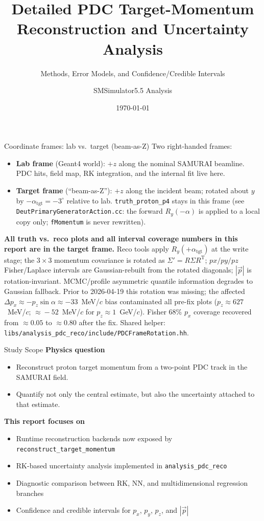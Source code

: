 \documentclass[aspectratio=169]{beamer}
\title[PDC Reconstruction and Uncertainty]{Detailed PDC Target-Momentum Reconstruction and Uncertainty Analysis}
\subtitle{Methods, Error Models, and Confidence/Credible Intervals}
\author{SMSimulator5.5 Analysis}
\date{\today}
\begin{document}
\begin{frame}
\titlepage
\end{frame}

\begin{frame}{Coordinate frames: lab vs.\ target (beam-as-Z)}
\small
Two right-handed frames:
\begin{itemize}
  \item \textbf{Lab frame} (Geant4 world): $+z$ along the nominal SAMURAI beamline.
    PDC hits, field map, RK integration, and the internal fit live here.
  \item \textbf{Target frame} (``beam-as-Z''): $+z$ along the incident beam;
    rotated about $y$ by $-\alpha_\mathrm{tgt}=-3^\circ$ relative to lab.
    \texttt{truth\_proton\_p4} stays in this frame
    (see \texttt{DeutPrimaryGeneratorAction.cc}: the forward $R_y(-\alpha)$ is
    applied to a local copy only; \texttt{fMomentum} is never rewritten).
\end{itemize}

\textbf{All truth vs.\ reco plots and all interval coverage numbers in this
report are in the target frame.} Reco tools apply $R_y(+\alpha_\mathrm{tgt})$
at the write stage; the $3\times3$ momentum covariance is rotated as
$\Sigma'=R\Sigma R^\mathrm{T}$; $px/py/pz$ Fisher/Laplace intervals are
Gaussian-rebuilt from the rotated diagonals; $|\vec p|$ is rotation-invariant.
MCMC/profile asymmetric quantile information degrades to Gaussian fallback.
Prior to 2026-04-19 this rotation was missing; the affected
$\Delta p_x \approx -p_z\sin\alpha \approx -33$~MeV/$c$ bias contaminated
all pre-fix plots ($p_z \approx 627$~MeV/$c$; $\approx\!-52$~MeV/$c$ for
$p_z \approx 1$~GeV/$c$). Fisher 68\% $p_x$ coverage recovered from $\approx 0.05$
to $\approx 0.80$ after the fix.
Shared helper: \texttt{libs/analysis\_pdc\_reco/include/PDCFrameRotation.hh}.
\end{frame}

\begin{frame}{Study Scope}
\textbf{Physics question}
\begin{itemize}
\item Reconstruct proton target momentum from a two-point PDC track in the SAMURAI field.
\item Quantify not only the central estimate, but also the uncertainty attached to that estimate.
\end{itemize}

\vspace{0.2cm}
\textbf{This report focuses on}
\begin{itemize}
\item Runtime reconstruction backends now exposed by \texttt{reconstruct\_target\_momentum}
\item RK-based uncertainty analysis implemented in \texttt{analysis\_pdc\_reco}
\item Diagnostic comparison between RK, NN, and multidimensional regression branches
\item Confidence and credible intervals for \(p_x\), \(p_y\), \(p_z\), and \(|\vec p|\)
\end{itemize}
\end{frame}
\end{document}
